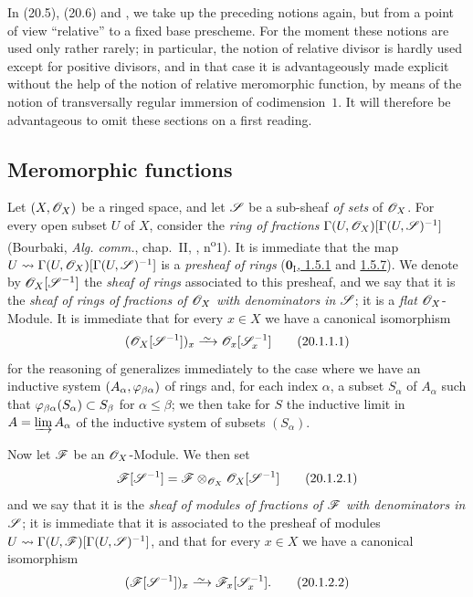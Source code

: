 In (20.5), (20.6) and , we take up the preceding notions again, but from a point of view ``relative'' to a fixed base prescheme.
For the moment these notions are used only rather rarely; in particular, the notion of relative divisor is hardly used except for positive divisors, and in that case it is advantageously made explicit without the help of the notion of relative meromorphic function, by means of the notion of transversally regular immersion of codimension~$1$.
It will therefore be advantageous to omit these sections on a first reading.

\subsection{Meromorphic functions}

\begin{env}[20.1.1]\label{IV.20.1.1}
Let $(X,\mathscr{O}_X)$ be a ringed space, and let $\mathscr{S}$ be a sub-sheaf \emph{of sets} of $\mathscr{O}_X$.
For every open subset $U$ of $X$, consider the \emph{ring of fractions} $\Gamma(U,\mathscr{O}_X)[\Gamma(U,\mathscr{S})^{-1}]$ (Bourbaki, \emph{Alg. comm.}, chap.~II, , n\textsuperscript{o}1).
It is immediate that the map $U\leadsto\Gamma(U,\mathscr{O}_X)[\Gamma(U,\mathscr{S})^{-1}]$ is a \emph{presheaf of rings} (\hyperref[0.1.5.1]{$\mathbf{0}_{\mathrm{I}}$, 1.5.1} and \hyperref[0.1.5.7]{1.5.7}).
We denote by $\mathscr{O}_X[\mathscr{S}^{-1}]$ the \emph{sheaf of rings} associated to this presheaf, and we say that it is the \emph{sheaf of rings of fractions of $\mathscr{O}_X$ with denominators in $\mathscr{S}$}; it is a \emph{flat} $\mathscr{O}_X$-Module.
It is immediate that for every $x\in X$ we have a canonical isomorphism
\[
\label{IV.20.1.1.1}
  (\sh{O}_X[\sh{S}^{-1}])_x\simto\sh{O}_x[\sh{S}_x^{-1}]
  \tag{20.1.1.1}
\]
for the reasoning of  generalizes immediately to the case where we have an inductive system $(A_\alpha,\varphi_{\beta\alpha})$ of rings and, for each index $\alpha$, a subset $S_\alpha$ of $A_\alpha$ such that
$\varphi_{\beta\alpha}(S_\alpha)\subset S_\beta$ for $\alpha\leq\beta$; we then take for $S$ the inductive limit in $A=\varinjlim A_\alpha$ of the inductive system of subsets $(S_\alpha)$.
\end{env}

\begin{env}[20.1.2]\label{IV.20.1.2}
Now let $\mathscr{F}$ be an $\mathscr{O}_X$-Module.
We then set
\[
\label{IV.20.1.2.1}
  \mathscr{F}[\mathscr{S}^{-1}]=\mathscr{F}\otimes_{\mathscr{O}_X}\mathscr{O}_X[\mathscr{S}^{-1}]
  \tag{20.1.2.1}
\]
and we say that it is the \emph{sheaf of modules of fractions of $\mathscr{F}$ with denominators in $\mathscr{S}$}; it is immediate that it is associated to the presheaf of modules $U\leadsto\Gamma(U,\mathscr{F})[\Gamma(U,\mathscr{S})^{-1}]$, and that for every $x\in X$ we have a canonical isomorphism
\[
\label{IV.20.1.2.2}
  (\sh{F}[\sh{S}^{-1}])_x\simto\sh{F}_x[\sh{S}_x^{-1}].
  \tag{20.1.2.2}
\]
\end{env}

